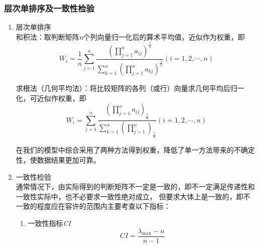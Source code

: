 \documentclass[a4paper, 12pt]{article}
\numberwithin{equation}{section}
\begin{document}
                \subsubsection{层次单排序及一致性检验}
                    \begin{enumerate}
                        \item 层次单排序 \\
                            和积法：取判断矩阵\textit{n}个列向量归一化后的算术平均值，近似作为权重，即
                            \begin{equation}
                                W_{i} = \frac{1}{n} \sum_{j=1}^{n} \frac{(\prod_{j=1}^{n} a_{ij})^{\frac{1}{n}}}{\sum_{k=1}^{n} (\prod_{j=1}^{n} a_{kj})^{\frac{1}{n}}} (i = 1, 2, \cdots, n)
                            \end{equation}

                            求根法（几何平均法）：将比较矩阵的各列（或行）向量求几何平均后归一化，可近似作权重，即
                            \begin{equation}
                                W_{i} = \sum_{j=1}^{n} \frac{(\prod_{j=1}^{n} a_{ij})_{\frac{1}{n}}}{\sum_{k=1}^{n} (\prod_{j=1}^{n})_{\frac{1}{n}}} (i = 1, 2, \cdots, n)
                            \end{equation}

                            在我们的模型中综合采用了两种方法得到权重，降低了单一方法带来的不确定性，使数据结果更加可靠。


                        \item 一致性检验 \\
                        通常情况下，由实际得到的判断矩阵不一定是一致的，即不一定满足传递性和一致性实际中，也不必要求一致性绝对成立，
                        但要求大体上是一致的，即不一致的程度应在容许的范围内主要考查以下指标：
                            \begin{enumerate}
                                \item 一致性指标\textit{CI}
                                    \begin{equation}
                                        CI = \frac{\lambda _{\max} - n}{n - 1}
                                    \end{equation}


\end{enumerate}
\end{enumerate}
\end{document}
